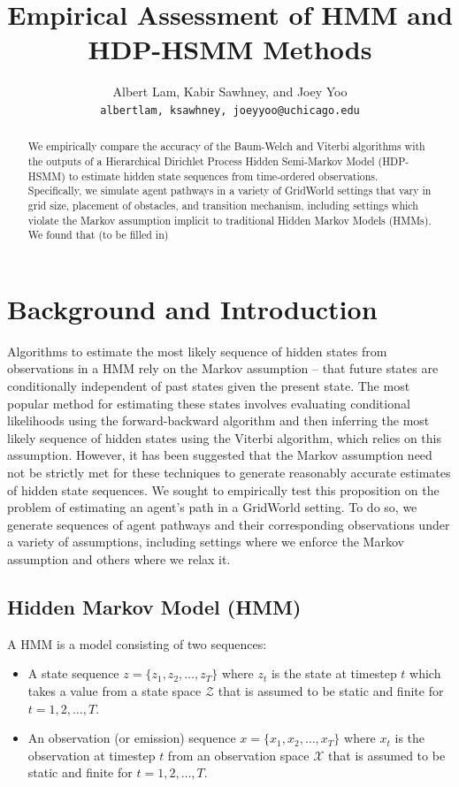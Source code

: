 \documentclass{article}
\title{Empirical Assessment of HMM and HDP-HSMM Methods}
\author{%
  Albert Lam, Kabir Sawhney, and Joey Yoo \\
  \texttt{albertlam, ksawhney, joeyyoo@uchicago.edu} \\
}
\begin{document}

\maketitle

\begin{abstract}
We empirically compare the accuracy of the Baum-Welch and Viterbi algorithms with the outputs of a Hierarchical Dirichlet Process Hidden Semi-Markov Model (HDP-HSMM) to estimate hidden state sequences from time-ordered observations. Specifically, we simulate agent pathways in a variety of GridWorld settings that vary in grid size, placement of obstacles, and transition mechanism, including settings which violate the Markov assumption implicit to traditional Hidden Markov Models (HMMs). We found that (to be filled in)
\end{abstract}

\section{Background and Introduction}

Algorithms to estimate the most likely sequence of hidden states from observations in a HMM rely on the Markov assumption -- that future states are conditionally independent of past states given the present state. The most popular method for estimating these states involves evaluating conditional likelihoods using the forward-backward algorithm and then inferring the most likely sequence of hidden states using the Viterbi algorithm, which relies on this assumption. However, it has been suggested that the Markov assumption need not be strictly met for these techniques to generate reasonably accurate estimates of hidden state sequences. We sought to empirically test this proposition on the problem of estimating an agent's path in a GridWorld setting. To do so, we generate sequences of agent pathways and their corresponding observations under a variety of assumptions, including settings where we enforce the Markov assumption and others where we relax it.

\subsection{Hidden Markov Model (HMM)}
A HMM is a model consisting of two sequences:
\begin{itemize}
  \item A state sequence $z = \{z_1, z_2, \dots, z_T\}$ where $z_t$ is the state at timestep $t$ which takes a value from a state space $\mathcal{Z}$ that is assumed to be static and finite for $t = 1, 2, \dots, T$.
  \item An observation (or emission) sequence $x = \{x_1, x_2, \dots, x_T\}$ where $x_t$ is the observation at timestep $t$ from an observation space $\mathcal{X}$ that is assumed to be static and finite for $t = 1, 2, \dots, T$.
\end{itemize}
\end{document}
